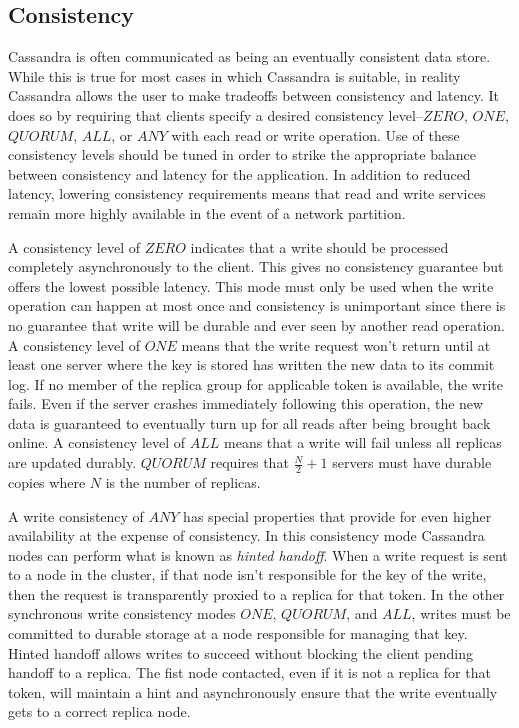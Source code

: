 \documentclass[twocolumn]{article}
\begin{document}
\subsection{Consistency}\label{s:consistency}

Cassandra is often communicated as being an eventually consistent data store.  While this is true for most cases in which Cassandra is suitable, in reality Cassandra allows the user to make tradeoffs between consistency and latency.  It does so by requiring that clients specify a desired consistency level--$ZERO$, $ONE$, $QUORUM$, $ALL$, or $ANY$ with each read or write operation.  Use of these consistency levels should be tuned in order to strike the appropriate balance between consistency and latency for the application.  In addition to reduced latency, lowering consistency requirements means that read and write services remain more highly available in the event of a network partition.

A consistency level of $ZERO$ indicates that a write should be processed completely asynchronously to the client.  This gives no consistency guarantee but offers the lowest possible latency.  This mode must only be used when the write operation can happen at most once and consistency is unimportant since there is no guarantee that write will be durable and ever seen by another read operation.  A consistency level of $ONE$ means that the write request won't return until at least one server where the key is stored has written the new data to its commit log.  If no member of the replica group for applicable token is available, the write fails.  Even if the server crashes immediately following this operation, the new data is guaranteed to eventually turn up for all reads after being brought back online. A consistency level of $ALL$ means that a write will fail unless all replicas are updated durably.  $QUORUM$ requires that $\frac{N}{2}+1$ servers must have durable copies where $N$ is the number of replicas.

A write consistency of $ANY$ has special properties that provide for even higher availability at the expense of consistency.  In this consistency mode Cassandra nodes can perform what is known as \emph{hinted handoff}.  When a write request is sent to a node in the cluster, if that node isn't responsible for the key of the write, then the request is transparently proxied to a replica for that token.  In the other synchronous write consistency modes $ONE$, $QUORUM$, and $ALL$, writes must be committed to durable storage at a node responsible for managing that key.  Hinted handoff allows writes to succeed without blocking the client pending handoff to a replica.  The fist node contacted, even if it is not a replica for that token, will maintain a hint and asynchronously ensure that the write eventually gets to a correct replica node.
\end{document}
